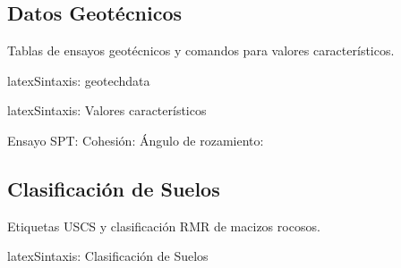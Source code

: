 \vspace{1em}
\noindent
{}
\hfill
{}

\subsection{Datos Geotécnicos}
\label{subsec:geotecnia}

Tablas de ensayos geotécnicos y comandos para valores característicos.


\begin{codigosimple}{latex}{Sintaxis: geotechdata}
\begin{geotechdata}
\end{geotechdata}
\end{codigosimple}

\begin{geotechdata}
\end{geotechdata}


\begin{codigosimple}{latex}{Sintaxis: Valores característicos}
      
\end{codigosimple}

\vspace{0.5em}
\noindent
Ensayo SPT:  \quad
Cohesión:  \quad
Ángulo de rozamiento: 

\subsection{Clasificación de Suelos}
\label{subsec:clasificacion-suelos}

Etiquetas USCS y clasificación RMR de macizos rocosos.

\begin{codigosimple}{latex}{Sintaxis: Clasificación de Suelos}
\end{codigosimple}

